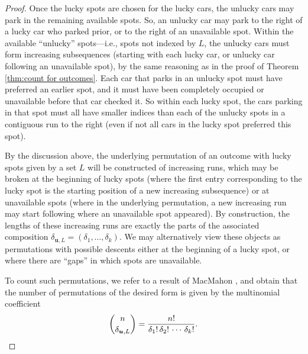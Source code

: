 \documentclass[reqno]{amsart}
\theoremstyle{definition}
\theoremstyle{remark}
\newcommand{\bsy}{\boldsymbol}
\begin{document}
\begin{proof}
 

Once the lucky spots are chosen for the lucky cars, the unlucky cars may park in the remaining available spots.
So, an unlucky car may park to the right of a lucky car who parked prior, or to the right of an unavailable spot. Within the available ``unlucky'' spots---i.e., spots not indexed by $L$, the unlucky cars must form increasing subsequences (starting with each lucky car, or unlucky car following an unavailable spot), by the same reasoning as in the proof of Theorem \ref{thm:count for outcomes}. Each car that parks in an unlucky spot must have preferred an earlier spot, and it must have been completely occupied or unavailable before that car checked it. So within each lucky spot, the cars parking in that spot must all have smaller indices than each of the unlucky spots in a contiguous run to the right (even if not all cars in the lucky spot preferred this spot). 


By the discussion above, the underlying permutation of an outcome with lucky spots given by a set $L$ will be constructed of increasing runs, which may be broken at the beginning of lucky spots (where the first entry corresponding to the lucky spot is the starting position of a new increasing subsequence) or at unavailable spots (where in the underlying permutation, a new increasing run may start following where an unavailable spot appeared).  By construction, the lengths of these increasing runs are exactly the parts of the associated composition $\delta_{\bsy u, L} =  (\delta_1, \ldots, \delta_k)$. We may alternatively view these objects as permutations with possible descents either at the beginning of a lucky spot, 
or where there are ``gaps'' in which spots are unavailable.

To count such permutations, we refer to a result of MacMahon \cite[Art. 157]{MacMahon}, and obtain that the number of permutations of the desired form is given by the multinomial coefficient \[\binom{n}{\delta_{\bsy u, L}} = \frac{n!}{\delta_1!\, \delta_2 ! \,\cdots\, \delta_k!}.\qedhere\]
\end{proof}
\end{document}
